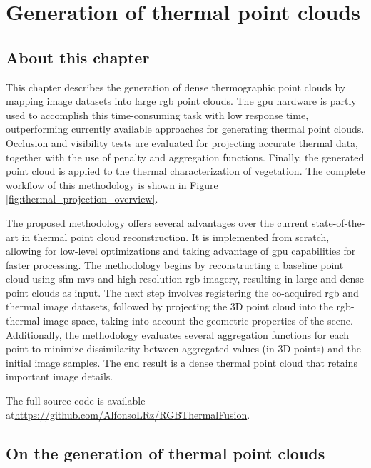 \setchapterpreamble[u]{\margintoc}
\chapter{Generation of thermal point clouds}
\label{sec:thermal_pc}

\section*{About this chapter}

This chapter describes the generation of dense thermographic point clouds by mapping image datasets into large \acrshort{rgb} point clouds. The \acrshort{gpu} hardware is partly used to accomplish this time-consuming task with low response time, outperforming currently available approaches for generating thermal point clouds. Occlusion and visibility tests are evaluated for projecting accurate thermal data, together with the use of penalty and aggregation functions. Finally, the generated point cloud is applied to the thermal characterization of vegetation. The complete workflow of this methodology is shown in Figure \ref{fig:thermal_projection_overview}.

The proposed methodology offers several advantages over the current state-of-the-art in thermal point cloud reconstruction. It is implemented from scratch, allowing for low-level optimizations and taking advantage of \acrshort{gpu} capabilities for faster processing. The methodology begins by reconstructing a baseline point cloud using \acrshort{sfm}-\acrshort{mvs} and high-resolution \acrshort{rgb} imagery, resulting in large and dense point clouds as input. The next step involves registering the co-acquired \acrshort{rgb} and thermal image datasets, followed by projecting the 3D point cloud into the \acrshort{rgb}-thermal image space, taking into account the geometric properties of the scene. Additionally, the methodology evaluates several aggregation functions for each point to minimize dissimilarity between aggregated values (in 3D points) and the initial image samples. The end result is a dense thermal point cloud that retains important image details.

The full source code is available at\newline \small\url{https://github.com/AlfonsoLRz/RGBThermalFusion}.\normalsize

\section{On the generation of thermal point clouds}

